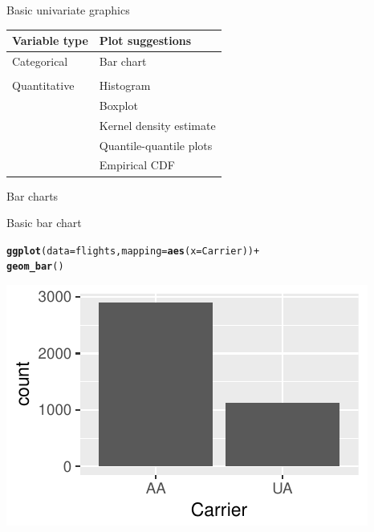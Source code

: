 \documentclass[10pt]{beamer}\usepackage[]{graphicx}\usepackage[]{color}
\makeatletter
\def\maxwidth{ %
  \ifdim\Gin@nat@width>\linewidth
    \linewidth
  \else
    \Gin@nat@width
  \fi
}
\newcommand{\hlopt}[1]{\textcolor[rgb]{0,0,0}{#1}}%
\newcommand{\hlstd}[1]{\textcolor[rgb]{0.345,0.345,0.345}{#1}}%
\newcommand{\hlkwc}[1]{\textcolor[rgb]{0.333,0.667,0.333}{#1}}%
\newcommand{\hlkwd}[1]{\textcolor[rgb]{0.737,0.353,0.396}{\textbf{#1}}}%
\newenvironment{kframe}{%
 \def\at@end@of@kframe{}%
 \ifinner\ifhmode%
  \def\at@end@of@kframe{\end{minipage}}%
  \begin{minipage}{\columnwidth}%
 \fi\fi%
 \def\FrameCommand##1{\hskip\@totalleftmargin \hskip-\fboxsep
 \colorbox{shadecolor}{##1}\hskip-\fboxsep
     \hskip-\linewidth \hskip-\@totalleftmargin \hskip\columnwidth}%
 \MakeFramed {\advance\hsize-\width
   \@totalleftmargin\z@ \linewidth\hsize
   \@setminipage}}%
 {\par\unskip\endMakeFramed%
 \at@end@of@kframe}
\newenvironment{knitrout}{}{} %
\makeatother
\begin{document}
\begin{frame}[fragile]{Basic univariate graphics}

\begin{tabular}{ll} \hline
Variable type & Plot suggestions\\\hline
Categorical   & Bar chart\\
              & \\
Quantitative  & Histogram\\
              & Boxplot\\
              & Kernel density estimate\\ 
              & Quantile-quantile plots\\
              & Empirical CDF\\
\hline
\end{tabular}

\end{frame}

\begin{frame}[fragile]{Bar charts}

Basic bar chart

\begin{knitrout}\small
{}\color{fgcolor}\begin{kframe}
\begin{alltt}
\hlkwd{ggplot}\hlstd{(}\hlkwc{data} \hlstd{= flights,} \hlkwc{mapping} \hlstd{=} \hlkwd{aes}\hlstd{(}\hlkwc{x} \hlstd{= Carrier))} \hlopt{+}
  \hlkwd{geom_bar}\hlstd{()}
\end{alltt}
\end{kframe}
\includegraphics[width=\maxwidth]{figure/unnamed-chunk-14-1} 

\end{knitrout}

\end{frame}
\end{document}
